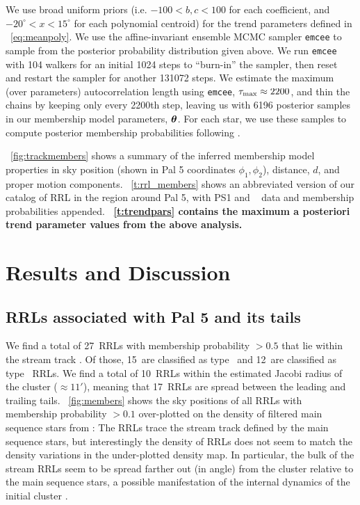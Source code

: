 \documentclass[twocolumn]{aastex63}
\newcommand{\changes}[1]{{\textbf{#1}}}
\newcommand{\NRRL}{27}     %
\newcommand{\NRRab}{15}    %
\newcommand{\NRRc}{12}     %
\newcommand{\NRRcl}{10}     %
\newcommand{\NRRtails}{17} %
\begin{document}
We use broad uniform priors (i.e. $-100 < b, c < 100$ for each coefficient, and $-20^\circ < x < 15^\circ$ for each polynomial centroid) for the trend parameters defined in \equationname~\ref{eq:meanpoly}.
We use the affine-invariant ensemble MCMC sampler \texttt{emcee} \citep{emcee} to sample from the posterior probability distribution given above.
We run \texttt{emcee} with 104 walkers for an initial 1024 steps to ``burn-in'' the sampler, then reset and restart the sampler for another 131072 steps.
We estimate the maximum (over parameters) autocorrelation length using \texttt{emcee}, $\tau_{\rm max} \approx 2200$, and thin the chains by keeping only every 2200th step, leaving us with 6196 posterior samples in our membership model parameters, $\boldsymbol{\theta}$.
For each star, we use these samples to compute posterior membership probabilities following \citet{DFM:blog}.

\figurename~\ref{fig:trackmembers} shows a summary of the inferred membership model properties in sky position (shown in Pal 5 coordinates $\phi_1, \phi_2$), distance, $d$, and proper motion components.
\tablename~\ref{t:rrl_members} shows an abbreviated version of our catalog of RRL in the region around Pal 5, with PS1 and \Gaia~ data and membership probabilities appended.
\changes{\tablename~\ref{t:trendpars} contains the maximum a posteriori trend parameter values from the above analysis.}

\section{Results and Discussion} \label{sec:results}

\subsection{RRLs associated with Pal 5 and its tails}
We find a total of \NRRL\ RRLs with membership probability $> 0.5$ that lie within the stream track \citep[again using the track from][see lines in Figure~\ref{fig:members}]{Bonaca:2019}.
Of those, \NRRab\ are classified as type \typeab\ and \NRRc\ are classified as type \typec\ RRLs.
We find a total of \NRRcl\ RRLs within the estimated Jacobi radius of the cluster ($\approx 11'$), meaning that \NRRtails\ RRLs are spread between the leading and trailing tails.
\figurename~\ref{fig:members} shows the sky positions of all RRLs with membership probability $>0.1$ over-plotted on the density of filtered main sequence stars from \citet{Bonaca:2019}:
The RRLs trace the stream track defined by the main sequence stars, but interestingly the density of RRLs does not seem to match the density variations in the under-plotted density map.
In particular, the bulk of the stream RRLs seem to be spread farther out (in angle) from the cluster relative to the main sequence stars, a possible manifestation of the internal dynamics of the initial cluster \citep[e.g., mass segregation][]{Koch:2004}.
\end{document}
